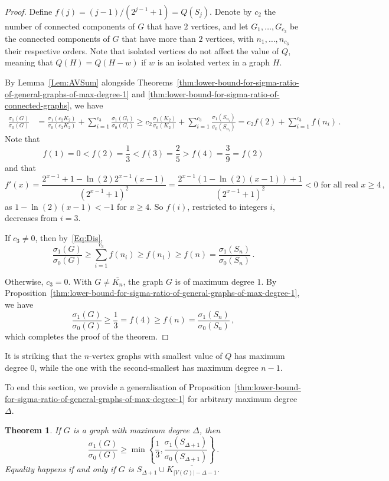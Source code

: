 \documentclass[a4paper,12pt]{amsart}
\newtheorem{thm}{Theorem}
\begin{document}
\begin{proof}
Define $f(j)=(j-1)/(2^{j-1}+1)=Q(S_{j})$. Denote by $c_2$ the number of connected components of $G$ that have $2$ vertices, and let $G_1,\dots,G_{c_3}$ be the connected components of $G$ that have more than $2$ vertices, with $n_1,\dots,n_{c_3}$ their respective orders. Note that isolated vertices do not affect the value of $Q$, meaning that $Q(H)=Q(H-w)$ if $w$ is an isolated vertex in a graph $H$.

By Lemma~\ref{Lem:AVSum} alongside Theorems~\ref{thm:lower-bound-for-sigma-ratio-of-general-graphs-of-max-degree-1} and \ref{thm:lower-bound-for-sigma-ratio-of-connected-graphs}, we have
\begin{align}
\label{Eq:Dis}
\frac{\sigma_1(G)}{\sigma_0(G)}
&=\frac{\sigma_1 (c_2K_2)}{\sigma_0(c_2K_2)}+\sum_{i=1}^{c_3}\frac{\sigma_1(G_i)}{\sigma_0(G_i)}\geq c_2\frac{\sigma_1(K_2)}{\sigma_0(K_2)}+\sum_{i=1}^{c_3}\frac{\sigma_1(S_{n_i})}{\sigma_0(S_{n_i})}
=c_2f(2)+\sum_{i=1}^{c_3}f(n_i)\,.
\end{align}
Note that
$$f(1)=0<f(2)=\frac13<f(3)=\frac{2}{5}> f(4)=\frac{3}{9}=f(2)$$ and that
 $$f'(x)=\frac{2^{x-1}+1 -\ln(2)2^{x-1}(x-1)}{(2^{x-1}+1)^2}=\frac{2^{x-1}(1-\ln(2)(x-1))+1}{(2^{x-1}+1)^2}<0 \text{ for all real }x\geq 4\,,$$
 as $1-\ln(2)(x-1) <-1$ for $x\geq 4$. So $f(i)$, restricted to integers $i$, decreases from $i=3$.

If $c_3\neq 0$, then by~\eqref{Eq:Dis}, 
 $$
  \frac{\sigma_1(G)}{\sigma_0(G)}\geq \sum_{i=1}^{c_3}f(n_i)\geq f\left(n_1\right) \geq f(n)=\frac{\sigma_1(S_n)}{\sigma_0(S_n)}\,.
 $$

Otherwise, $c_3=0$. With $G\neq \overline{K_n}$, the graph $G$ is of maximum degree $1$. By Proposition~\ref{thm:lower-bound-for-sigma-ratio-of-general-graphs-of-max-degree-1}, we have
 $$
  \frac{\sigma_1(G)}{\sigma_0(G)}\geq \frac{1}{3}=f(4)\geq f(n)=\frac{\sigma_1(S_n)}{\sigma_0(S_n)}\,,
 $$ which completes the proof of the theorem.
\end{proof}

\medskip
It is striking that the $n$-vertex graphs with smallest value of $Q$ has maximum degree $0$, while the one with the second-smallest has maximum degree $n-1$.

\medskip
To end this section, we provide a generalisation of Proposition~\ref{thm:lower-bound-for-sigma-ratio-of-general-graphs-of-max-degree-1} for arbitrary maximum degree $\Delta$.

\begin{thm}
If $G$ is a graph with maximum degree $\Delta$, then
$$
\frac{\sigma_1(G)}{\sigma_0(G)}\geq \min \left\lbrace \frac{1}{3},\frac{\sigma_1(S_{\Delta+1})}{\sigma_0(S_{\Delta+1})}\right\rbrace \,.
$$
Equality happens if and only if $G$ is  $S_{\Delta+1}\cup \overline{K_{|V(G)|-\Delta -1}}$.
\end{thm}
\end{document}
